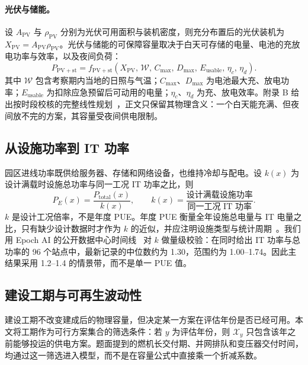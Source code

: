 \documentclass{mcmthesis}
\begin{document}
\paragraph{光伏与储能。}
设 \(A_{\mathrm{PV}}\) 与 \(\rho_{\mathrm{PV}}\) 分别为光伏可用面积与装机密度，则充分布置后的光伏装机为 \(X_{\mathrm{PV}}=A_{\mathrm{PV}}\rho_{\mathrm{PV}}\)。光伏与储能的可保障容量取决于白天可存储的电量、电池的充放电功率与效率，以及夜间负荷：
\begin{equation}
P_{\mathrm{PV+st}}=
f_{\mathrm{PV+st}}\left(X_{\mathrm{PV}},\,\mathcal W,\,C_{\max},\,D_{\max},\,E_{\mathrm{usable}},\,\eta_c,\,\eta_d\right).
\tag{6}
\end{equation}
其中 \(\mathcal W\) 包含考察期内当地的日照与气温；\(C_{\max}\)、\(D_{\max}\) 为电池最大充、放电功率；\(E_{\mathrm{usable}}\) 为扣除应急预留后可动用的电量；\(\eta_c\)、\(\eta_d\) 为充、放电效率。附录 B 给出按时段校核的完整线性规划~\cite{goiri2013}，正文只保留其物理含义：一个白天能充满、但夜间放不完的方案，其容量受夜间供电限制。

\subsection{从设施功率到 IT 功率}

园区进线功率既供给服务器、存储和网络设备，也维持冷却与配电。设 \(k(x)\) 为设计满载时设施总功率与同一工况 IT 功率之比，则
\begin{equation}
P_E(x)=\frac{P_{\mathrm{total}}(x)}{k(x)},\qquad
k(x)=\frac{\text{设计满载设施功率}}{\text{同一工况 IT 功率}}.
\tag{7}
\end{equation}
\(k\) 是设计工况倍率，不是年度 PUE。年度 PUE 衡量全年设施总电量与 IT 电量之比，只有缺少设计数据时才作为 \(k\) 的近似，并应注明设施类型与统计周期~\cite{itu2014}。我们用 Epoch AI 的公开数据中心时间线~\cite{epoch2026} 对 \(k\) 做量级校验：在同时给出 IT 功率与总功率的 96 个站点中，最新记录的中位数约为 1.30，范围约为 1.00--1.74。因此主结果采用 1.2--1.4 的情景带，而不是单一 PUE 值。

\subsection{建设工期与可再生波动性}

建设工期不改变建成后的物理容量，但决定某一方案在评估年份是否已经可用。本文将工期作为可行方案集合的筛选条件：若 \(y\) 为评估年份，则 \(\mathcal X_y\) 只包含该年之前能够投运的供电方案。题面提到的燃机长交付期、并网排队和变压器交付时间，均通过这一筛选进入模型，而不是在容量公式中直接乘一个折减系数。
\end{document}

